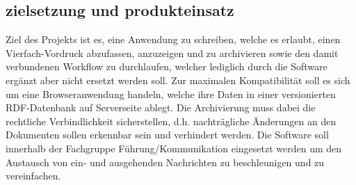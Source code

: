 \subsection{zielsetzung und produkteinsatz}
Ziel des Projekts ist es, eine Anwendung zu schreiben, welche es erlaubt, einen Vierfach-Vordruck
abzufassen, anzuzeigen und zu archivieren sowie den damit verbundenen Workflow zu durchlaufen, 
welcher lediglich durch die Software ergänzt aber nicht ersetzt werden soll. 
Zur maximalen Kompatibilität soll es sich um eine Browseranwendung handeln, welche ihre Daten in
einer versionierten RDF-Datenbank auf Serverseite ablegt. 
Die Archivierung muss dabei die rechtliche Verbindlichkeit sicherstellen, d.h. nachträgliche
Änderungen an den Dokumenten sollen erkennbar sein und verhindert werden.
Die Software soll innerhalb der Fachgruppe Führung/Kommunikation eingesetzt werden um den Austausch 
von ein- und ausgehenden Nachrichten zu beschleunigen und zu vereinfachen.
